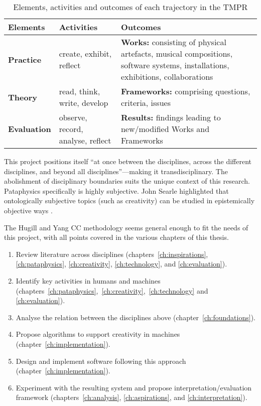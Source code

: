 \begin{table}[!htbp]
\caption[Elements, activities and outcomes of the TMPR]{Elements, activities and outcomes of each trajectory in the TMPR}
\label{tab:tmpr}
  \begin{tabu}{X[1]X[2]X[3]}
  \toprule
  \textbf{Elements}
  &
  \textbf{Activities}
  &
  \textbf{Outcomes}
  \\ \midrule
  \textbf{Practice}
  &
  create, exhibit, reflect
  &
  \textbf{Works:} consisting of physical artefacts, musical compositions, software systems, installations, exhibitions, collaborations
  \\ \midrule
  \textbf{Theory}
  &
  read, think, write, develop
  &
  \textbf{Frameworks:} comprising questions, criteria, issues
  \\ \midrule
  \textbf{Evaluation}
  &
  observe, record, analyse, reflect
  &
  \textbf{Results:} findings leading to new/modified Works and Frameworks
  \\ \bottomrule
  \end{tabu}
\end{table}

\spirals

This project positions itself ``at once between the disciplines, across the different disciplines, and beyond all disciplines''---making it transdisciplinary. The abolishment of disciplinary boundaries suits the unique context of this research. Pataphysics specifically is highly subjective. John Searle highlighted that ontologically subjective topics (such as creativity) can be studied in epistemically objective ways \autocite*{Searle2015}.

The Hugill and Yang \ac{CC} methodology seems general enough to fit the needs of this project, with all points covered in the various chapters of this thesis.

\begin{enumerate}
  \item Review literature across disciplines (chapters~\ref{ch:inspirations}, \ref{ch:pataphysics}, \ref{ch:creativity}, \ref{ch:technology}, and \ref{ch:evaluation}).
  \item Identify key activities in humans and machines (chapters~\ref{ch:pataphysics},~\ref{ch:creativity},~\ref{ch:technology} and \ref{ch:evaluation}).
  \item Analyse the relation between the disciplines above (chapter~\ref{ch:foundations}).
  \item Propose algorithms to support creativity in machines (chapter~\ref{ch:implementation}).
  \item Design and implement software following this approach (chapter~\ref{ch:implementation}).
  \item Experiment with the resulting system and propose interpretation/evaluation framework (chapters~\ref{ch:analysis}, \ref{ch:aspirations}, and \ref{ch:interpretation}).
\end{enumerate}

